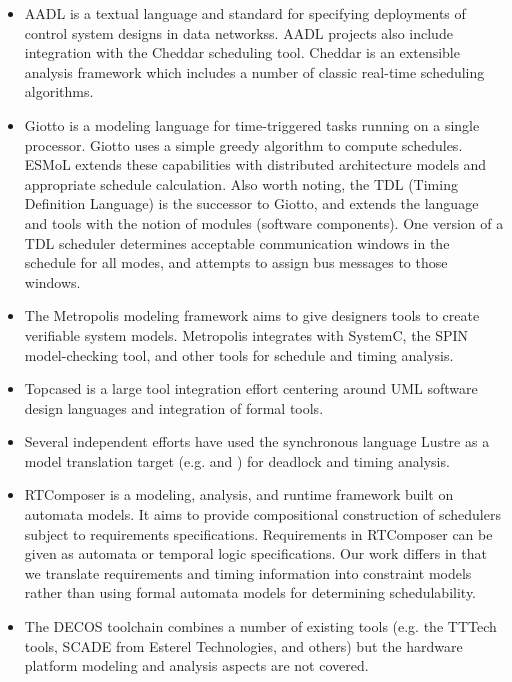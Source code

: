 \begin{itemize}

\item AADL is a textual language and standard for specifying deployments of control system designs in data 
networks\cite{modeling:aadl_control_systems}s.  AADL projects also include integration with the Cheddar 
scheduling tool\cite{sched:aadl_sched}. Cheddar is an extensible analysis framework which includes a 
number of classic real-time scheduling algorithms\cite{sched:cheddar}.

\item Giotto\cite{modeling:giotto3} is a modeling language for time-triggered tasks 
running on a single processor.  Giotto uses a simple greedy algorithm to compute schedules.  ESMoL 
extends these capabilities with distributed architecture models and appropriate schedule calculation.  
Also worth noting, the TDL (Timing Definition Language) is the successor to Giotto, and extends the 
language and tools with the notion of modules (software components)\cite{timed:tdl}.  One version of a 
TDL scheduler determines acceptable communication windows in the schedule for all modes, and attempts to 
assign bus messages to those windows\cite{timed:tdlflexray}.

\item The Metropolis modeling 
framework\cite{modeling:metropolis} aims to give designers tools to create verifiable system models.  
Metropolis integrates with SystemC, the SPIN model-checking tool, and other tools for schedule and 
timing analysis. 

\item Topcased\cite{tools:Topcased} is a large tool integration effort
centering around UML software design languages and integration of
formal tools.

\item Several independent efforts have used the synchronous language Lustre as a
model translation target (e.g. \cite{modeling:lustre2} and
\cite{modeling:lustre1}) for deadlock and timing analysis.

\item RTComposer\cite{modeling:rtcomposer} is a 
modeling, analysis, and runtime framework built on automata models.  It aims to provide compositional 
construction of schedulers subject to requirements specifications.  Requirements in RTComposer can be 
given as automata or temporal logic specifications.  Our work differs in that we translate requirements 
and timing information into constraint models rather than using formal automata models for determining 
schedulability.

\item The DECOS toolchain \cite{modeling:decos} combines a number of existing tools (e.g. the 
TTTech tools, SCADE from Esterel Technologies, and others) but the hardware platform modeling 
and analysis aspects are not covered.

\end{itemize}

